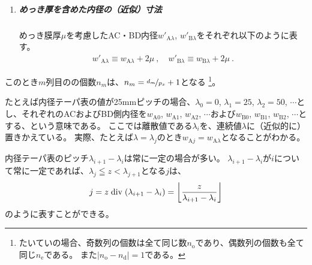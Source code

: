\begin{tcolorbox}[title={\dimple に関する表記法}, fonttitle=\gtfamily\bfseries, breakable, enhanced jigsaw]
\begin{enumerate}
\item
\subparagraph*{めっき厚を含めた内径の（近似）寸法}
めっき膜厚$\mu$を考慮したAC・BD内径$w'_{\mathrm A\lambda}$, $w'_{\mathrm B\lambda}$をそれぞれ以下のように表す。
\begin{align*}
  w'_{\mathrm A\lambda} \equiv w_{\mathrm A\lambda}+2\mu~, \quad
  w'_{\mathrm B\lambda} \equiv w_{\mathrm B\lambda}+2\mu~.
\end{align*}
\end{enumerate}
\end{tcolorbox}\noindent
このとき$m$列目の\dimple の個数$n_m$は、$n_m = \nicefrac{d_m}{p_x}+1$となる
\footnote{\label{fn:generallyDimpleN}%
たいていの場合、奇数列の個数は全て同じ数$n_\mathrm o$であり、偶数列の個数も全て同じ$n_\mathrm e$である。
また$|n_\mathrm o-n_\mathrm d| = 1$である。}。
\begin{hosoku}[label=hosoku:example4taper]
たとえば内径テーパ表の値が25mmピッチの場合、$\lambda_0=0$, $\lambda_1=25$, $\lambda_2=50$, $\cdots$とし、それぞれのACおよびBD側内径を$w_{\mathrm A0}$, $w_{\mathrm A1}$, $w_{\mathrm A2}$, $\cdots$および$w_{\mathrm B0}$, $w_{\mathrm B1}$, $w_{\mathrm B2}$, $\cdots$とする、という意味である。
ここでは離散値である$\lambda_i$を、連続値$\lambda$に（近似的に）置きかえている。
実際、たとえば$\lambda = \lambda_j$のとき$w_{\mathrm Aj} = w_{\mathrm A\lambda}$となることがわかる。
\end{hosoku}\relax
\begin{hosoku}
内径テーパ表のピッチ$\lambda_{i+1}-\lambda_i$は常に一定の場合が多い。
$\lambda_{i+1}-\lambda_i$が$i$について常に一定であれば、$\lambda_j \leqq z < \lambda_{j+1}$となる$j$は、
\begin{align*}
  j = z \bDiv (\lambda_{i+1}-\lambda_i) = \left\lfloor\frac z{\lambda_{i+1}-\lambda_i}\right\rfloor
\end{align*}
のように表すことができる。
\end{hosoku}
